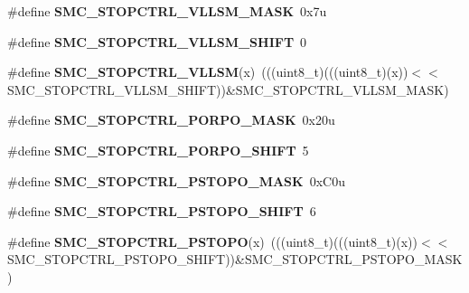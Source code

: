 \begin{DoxyCompactItemize}
\mbox{\label{group___s_m_c___register___masks_ga3136f47b42d64148e5d163e5df6fc661}} 
\#define {\bfseries S\+M\+C\+\_\+\+S\+T\+O\+P\+C\+T\+R\+L\+\_\+\+V\+L\+L\+S\+M\+\_\+\+M\+A\+SK}~0x7u
\item 
\mbox{\label{group___s_m_c___register___masks_gadcd933de05a733bb58e1bfdeba6c653b}} 
\#define {\bfseries S\+M\+C\+\_\+\+S\+T\+O\+P\+C\+T\+R\+L\+\_\+\+V\+L\+L\+S\+M\+\_\+\+S\+H\+I\+FT}~0
\item 
\mbox{\label{group___s_m_c___register___masks_gaab1f5f66e78683bda4b4a8c48f3c753d}} 
\#define {\bfseries S\+M\+C\+\_\+\+S\+T\+O\+P\+C\+T\+R\+L\+\_\+\+V\+L\+L\+SM}(x)~(((uint8\+\_\+t)(((uint8\+\_\+t)(x))$<$$<$S\+M\+C\+\_\+\+S\+T\+O\+P\+C\+T\+R\+L\+\_\+\+V\+L\+L\+S\+M\+\_\+\+S\+H\+I\+FT))\&S\+M\+C\+\_\+\+S\+T\+O\+P\+C\+T\+R\+L\+\_\+\+V\+L\+L\+S\+M\+\_\+\+M\+A\+SK)
\item 
\mbox{\label{group___s_m_c___register___masks_ga686e24e6e009e5066a1325f159c603bd}} 
\#define {\bfseries S\+M\+C\+\_\+\+S\+T\+O\+P\+C\+T\+R\+L\+\_\+\+P\+O\+R\+P\+O\+\_\+\+M\+A\+SK}~0x20u
\item 
\mbox{\label{group___s_m_c___register___masks_ga36eb36236efe97e99984cfc2e6f215be}} 
\#define {\bfseries S\+M\+C\+\_\+\+S\+T\+O\+P\+C\+T\+R\+L\+\_\+\+P\+O\+R\+P\+O\+\_\+\+S\+H\+I\+FT}~5
\item 
\mbox{\label{group___s_m_c___register___masks_ga8495d4f93210f68516438215c68c9b80}} 
\#define {\bfseries S\+M\+C\+\_\+\+S\+T\+O\+P\+C\+T\+R\+L\+\_\+\+P\+S\+T\+O\+P\+O\+\_\+\+M\+A\+SK}~0x\+C0u
\item 
\mbox{\label{group___s_m_c___register___masks_gac99e62cd86e9c12454c78fd6d5e3dc75}} 
\#define {\bfseries S\+M\+C\+\_\+\+S\+T\+O\+P\+C\+T\+R\+L\+\_\+\+P\+S\+T\+O\+P\+O\+\_\+\+S\+H\+I\+FT}~6
\item 
\mbox{\label{group___s_m_c___register___masks_gab9a92e4e28cd51019d49beff472acdc4}} 
\#define {\bfseries S\+M\+C\+\_\+\+S\+T\+O\+P\+C\+T\+R\+L\+\_\+\+P\+S\+T\+O\+PO}(x)~(((uint8\+\_\+t)(((uint8\+\_\+t)(x))$<$$<$S\+M\+C\+\_\+\+S\+T\+O\+P\+C\+T\+R\+L\+\_\+\+P\+S\+T\+O\+P\+O\+\_\+\+S\+H\+I\+FT))\&S\+M\+C\+\_\+\+S\+T\+O\+P\+C\+T\+R\+L\+\_\+\+P\+S\+T\+O\+P\+O\+\_\+\+M\+A\+SK)

\end{DoxyCompactItemize}
